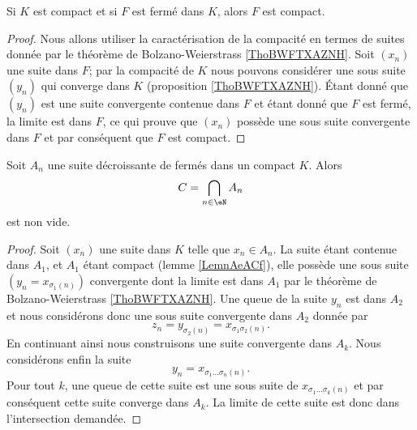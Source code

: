 \begin{lemma}   \label{LemnAeACf}
    Si \( K\) est compact et si \( F\) est fermé dans \( K\), alors \( F\) est compact.
\end{lemma}

\begin{proof}
    Nous allons utiliser la caractérisation de la compacité en termes de suites donnée par le théorème de Bolzano-Weierstrass \ref{ThoBWFTXAZNH}. Soit \( (x_n)\) une suite dans \( F\); par la compacité de \( K\) nous pouvons considérer une sous suite \( (y_n)\) qui converge dans \( K\) (proposition \ref{ThoBWFTXAZNH}). Étant donné que \( (y_n)\) est une suite convergente contenue dans \( F\) et étant donné que \( F\) est fermé, la limite est dans \( F\), ce qui prouve que \( (x_n)\) possède une sous suite convergente dans $F$ et par conséquent que \( F\) est compact.
\end{proof}

\begin{lemma}       \label{LemooynkH}
    Soit \( A_n\) une suite décroissante de fermés dans un compact \( K\). Alors
    \begin{equation}
        C=\bigcap_{n\in \eN}A_n
    \end{equation}
    est non vide. 
\end{lemma}

\begin{proof}
    Soit \( (x_n)\) une suite dans \( K\) telle que \( x_n\in A_n\). La suite étant contenue dans \( A_1\), et \( A_1\) étant compact (lemme \ref{LemnAeACf}), elle possède une sous suite \( (y_n=x_{\sigma_1(n)})\) convergente dont la limite est dans \( A_1\) par le théorème de Bolzano-Weierstrass \ref{ThoBWFTXAZNH}. Une queue de la suite \( y_n\) est dans \( A_2\) et nous considérons donc une sous suite convergente dans \( A_2\) donnée par
    \begin{equation}
        z_n=y_{\sigma_2(n)}=x_{\sigma_1\sigma_2(n)}.
    \end{equation}
    En continuant ainsi nous construisons une suite convergente dans \( A_k\). Nous considérons enfin la suite
    \begin{equation}
        y_n=x_{\sigma_1\ldots \sigma_n(n)}.
    \end{equation}
    Pour tout \( k\), une queue de cette suite est une sous suite de \( x_{\sigma_1\ldots \sigma_k(n)}\) et par conséquent cette suite converge dans \( A_k\). La limite de cette suite est donc dans l'intersection demandée.
\end{proof}

